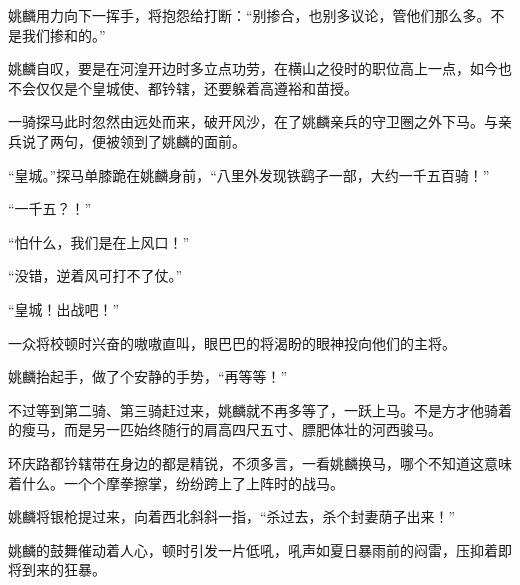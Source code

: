 姚麟用力向下一挥手，将抱怨给打断：“别掺合，也别多议论，管他们那么多。不是我们掺和的。”

姚麟自叹，要是在河湟开边时多立点功劳，在横山之役时的职位高上一点，如今也不会仅仅是个皇城使、都钤辖，还要躲着高遵裕和苗授。

一骑探马此时忽然由远处而来，破开风沙，在了姚麟亲兵的守卫圈之外下马。与亲兵说了两句，便被领到了姚麟的面前。

“皇城。”探马单膝跪在姚麟身前，“八里外发现铁鹞子一部，大约一千五百骑！”

“一千五？！”

“怕什么，我们是在上风口！”

“没错，逆着风可打不了仗。”

“皇城！出战吧！”

一众将校顿时兴奋的嗷嗷直叫，眼巴巴的将渴盼的眼神投向他们的主将。

姚麟抬起手，做了个安静的手势，“再等等！”

不过等到第二骑、第三骑赶过来，姚麟就不再多等了，一跃上马。不是方才他骑着的瘦马，而是另一匹始终随行的肩高四尺五寸、膘肥体壮的河西骏马。

环庆路都钤辖带在身边的都是精锐，不须多言，一看姚麟换马，哪个不知道这意味着什么。一个个摩拳擦掌，纷纷跨上了上阵时的战马。

姚麟将银枪提过来，向着西北斜斜一指，“杀过去，杀个封妻荫子出来！”

姚麟的鼓舞催动着人心，顿时引发一片低吼，吼声如夏日暴雨前的闷雷，压抑着即将到来的狂暴。

